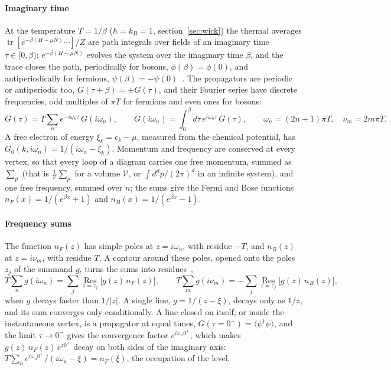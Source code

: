 \documentclass[11pt,a4paper]{article}
\begin{document}
\paragraph{Imaginary time} At the temperature $T=1/\beta$ ($\hbar=k_B=1$, section~\ref{sec:wick}) the thermal averages
$\operatorname{tr}[e^{-\beta(H-\mu N)}\cdots]/Z$ are path integrals over fields of an imaginary time $\tau\in[0,\beta)$:
$e^{-\beta(H-\mu N)}$ evolves the system over the imaginary time $\beta$, and the trace closes the path, periodically for
bosons, $\phi(\beta)=\phi(0)$, and antiperiodically for fermions, $\psi(\beta)=-\psi(0)$~\cite{NegeleOrland,AltlandSimons}.
The propagators are periodic or antiperiodic too, $G(\tau+\beta)=\pm G(\tau)$, and their Fourier series have discrete
frequencies, odd multiples of $\pi T$ for fermions and even ones for bosons:
\[
G(\tau)=T\sum_n e^{-i\omega_n\tau}\,G(i\omega_n),\qquad G(i\omega_n)=\int_0^\beta d\tau\,e^{i\omega_n\tau}\,G(\tau),\qquad
\omega_n=(2n+1)\pi T,\quad \nu_m=2m\pi T .
\]
A free electron of energy $\xi_k=\epsilon_k-\mu$, measured from the chemical potential, has
$G_0(k,i\omega_n)=1/(i\omega_n-\xi_k)$. Momentum and frequency are conserved at every vertex, so that every loop of a
diagram carries one free momentum, summed as $\sum_p$ (that is $\frac1{\mathcal V}\sum_p$ for a volume $\mathcal V$, or $\int d^dp/(2\pi)^d$ in an infinite
system), and one free frequency, summed over $n$; the sums give the Fermi and Bose functions $n_F(x)=1/(e^{\beta x}+1)$ and
$n_B(x)=1/(e^{\beta x}-1)$.

\paragraph{Frequency sums} The function $n_F(z)$ has simple poles at $z=i\omega_n$, with residue $-T$, and $n_B(z)$ at
$z=i\nu_m$, with residue $T$. A contour around these poles, opened onto the poles $z_j$ of the summand $g$, turns the sums
into residues~\cite{Mahan,BruusFlensberg,LeBellac1996,KapustaGale2006},
\[
T\sum_n g(i\omega_n)=\sum_j\operatorname*{Res}_{z=z_j}\bigl[g(z)\,n_F(z)\bigr],\qquad
T\sum_m g(i\nu_m)=-\sum_j\operatorname*{Res}_{z=z_j}\bigl[g(z)\,n_B(z)\bigr],
\]
when $g$ decays faster than $1/|z|$. A single line, $g=1/(z-\xi)$, decays only as $1/z$, and its sum converges only
conditionally. A line closed on itself, or inside the instantaneous vertex, is a propagator at equal times,
$G(\tau=0^-)=\langle\psi^\dagger\psi\rangle$, and the limit $\tau\to0^-$ gives the convergence factor $e^{i\omega_n0^+}$,
which makes $g(z)\,n_F(z)\,e^{z0^+}$ decay on both sides of the imaginary axis: $T\sum_ne^{i\omega_n0^+}/(i\omega_n-\xi)=n_F(\xi)$,
the occupation of the level.
\end{document}
